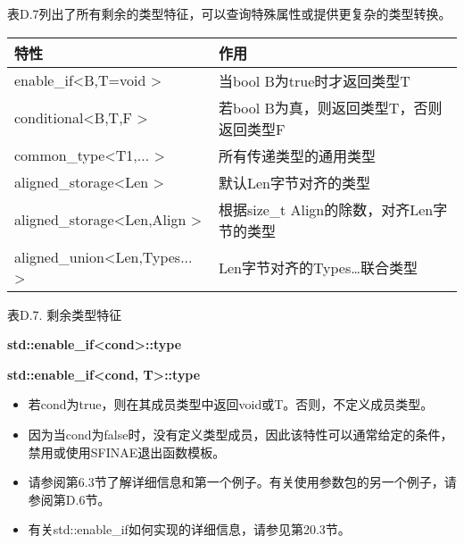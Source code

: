 

表D.7列出了所有剩余的类型特征，可以查询特殊属性或提供更复杂的类型转换。

\begin{table}[H]
	\begin{center}
	\begin{tabular}{l|l}
		\hline
		\textbf{特性}                                       & \textbf{作用}                                                   \\ \hline
		enable\_if\textless{}B,T=void \textgreater{}         & 当bool B为true时才返回类型T                              \\ \hline
		conditional\textless{}B,T,F \textgreater{}           & 若bool B为真，则返回类型T，否则返回类型F              \\ \hline
		common\_type\textless{}T1,... \textgreater{}         & 所有传递类型的通用类型                                   \\ \hline
		aligned\_storage\textless{}Len \textgreater{}        & 默认Len字节对齐的类型                          \\ \hline
		aligned\_storage\textless{}Len,Align \textgreater{}  & 根据size\_t Align的除数，对齐Len字节的类型 \\ \hline
		aligned\_union\textless{}Len,Types... \textgreater{} & Len字节对齐的Types…联合类型                 \\ \hline
	\end{tabular}
	\end{center}
\end{table}

\begin{center}
表D.7. 剩余类型特征
\end{center}

\textbf{std::enable\_if<cond>::type}

\textbf{std::enable\_if<cond, T>::type}

\begin{itemize}
\item
若cond为true，则在其成员类型中返回void或T。否则，不定义成员类型。

\item
因为当cond为false时，没有定义类型成员，因此该特性可以通常给定的条件，禁用或使用SFINAE退出函数模板。

\item
请参阅第6.3节了解详细信息和第一个例子。有关使用参数包的另一个例子，请参阅第D.6节。

\item
有关std::enable\_if如何实现的详细信息，请参见第20.3节。
\end{itemize}

